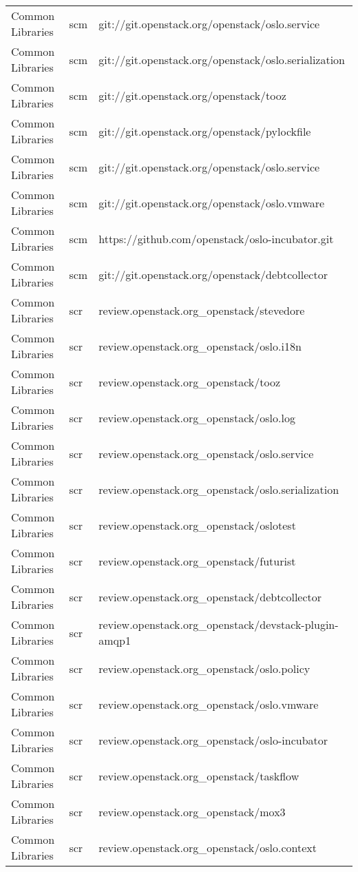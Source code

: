 \begin{center}
\begin{longtable}{|p{4cm}|p{1cm}|p{10cm}|}
Common Libraries&scm&git://git.openstack.org/openstack/oslo.service\\ 
Common Libraries&scm&git://git.openstack.org/openstack/oslo.serialization\\ 
Common Libraries&scm&git://git.openstack.org/openstack/tooz\\ 
Common Libraries&scm&git://git.openstack.org/openstack/pylockfile\\ 
Common Libraries&scm&git://git.openstack.org/openstack/oslo.service\\ 
Common Libraries&scm&git://git.openstack.org/openstack/oslo.vmware\\ 
Common Libraries&scm&https://github.com/openstack/oslo-incubator.git\\ 
Common Libraries&scm&git://git.openstack.org/openstack/debtcollector\\ 
Common Libraries&scr&review.openstack.org\_openstack/stevedore\\ 
Common Libraries&scr&review.openstack.org\_openstack/oslo.i18n\\ 
Common Libraries&scr&review.openstack.org\_openstack/tooz\\ 
Common Libraries&scr&review.openstack.org\_openstack/oslo.log\\ 
Common Libraries&scr&review.openstack.org\_openstack/oslo.service\\ 
Common Libraries&scr&review.openstack.org\_openstack/oslo.serialization\\ 
Common Libraries&scr&review.openstack.org\_openstack/oslotest\\ 
Common Libraries&scr&review.openstack.org\_openstack/futurist\\ 
Common Libraries&scr&review.openstack.org\_openstack/debtcollector\\ 
Common Libraries&scr&review.openstack.org\_openstack/devstack-plugin-amqp1\\ 
Common Libraries&scr&review.openstack.org\_openstack/oslo.policy\\ 
Common Libraries&scr&review.openstack.org\_openstack/oslo.vmware\\ 
Common Libraries&scr&review.openstack.org\_openstack/oslo-incubator\\ 
Common Libraries&scr&review.openstack.org\_openstack/taskflow\\ 
Common Libraries&scr&review.openstack.org\_openstack/mox3\\ 
Common Libraries&scr&review.openstack.org\_openstack/oslo.context\\ 

\end{longtable}
\end{center}
